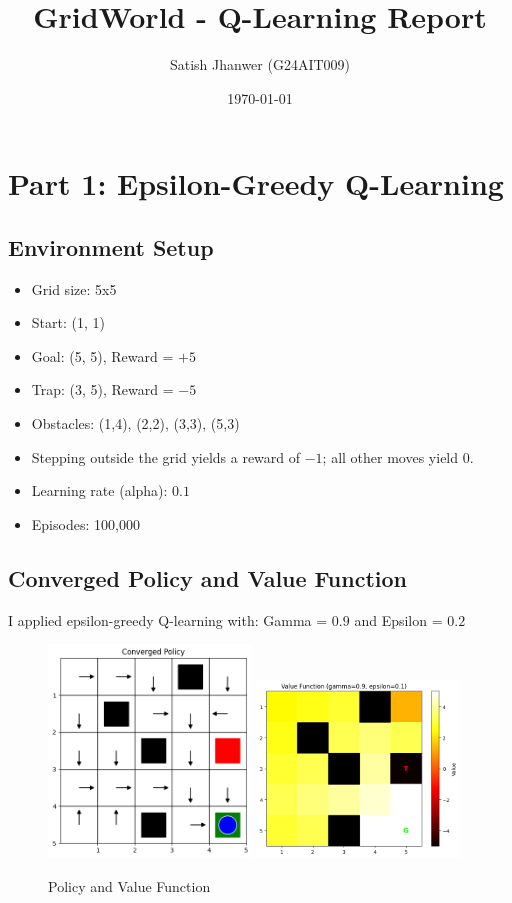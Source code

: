 \documentclass[12pt]{article}
\title{\textbf{GridWorld - Q-Learning Report}}
\author{Satish Jhanwer (G24AIT009)}
\date{\today}
\begin{document}
\maketitle
\tableofcontents
\newpage
\listoffigures
\newpage

\section{Part 1: Epsilon-Greedy Q-Learning}

\subsection{Environment Setup}
\begin{itemize}
  \item Grid size: 5x5
  \item Start: (1, 1)
  \item Goal: (5, 5), Reward = \(+5\)
  \item Trap: (3, 5), Reward = \(-5\)
  \item Obstacles: (1,4), (2,2), (3,3), (5,3)
  \item Stepping outside the grid yields a reward of \(-1\); all other moves yield 0.
  \item Learning rate (alpha): \(0.1\)
  \item Episodes: 100,000
\end{itemize}

\subsection{Converged Policy and Value Function}
I applied epsilon-greedy Q-learning with: Gamma = \(0.9\) and Epsilon = \(0.2\)

\begin{figure}[htbp]
  \centering
  \includegraphics[width=0.48\textwidth]{images/part1_q1_policy.png}
  \includegraphics[width=0.48\textwidth]{images/part1_q1_value.png}
  \caption{Policy and Value Function}
\end{figure}
\end{document}
